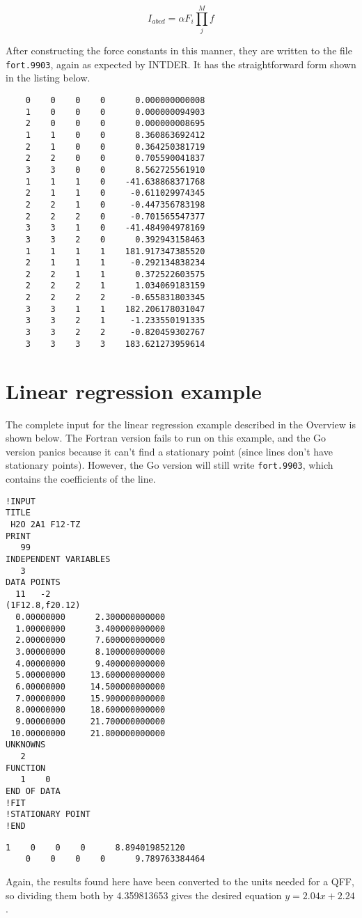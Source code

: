 \documentclass{article}
\begin{document}
\begin{equation}
  \label{eq:force}
  I_{abcd} = \alpha F_i \prod_j^M f
\end{equation}

After constructing the force constants in this manner, they are written to the
file \verb|fort.9903|, again as expected by INTDER. It has the straightforward
form shown in the listing below.

\begin{lstlisting}
    0    0    0    0      0.000000000008
    1    0    0    0      0.000000094903
    2    0    0    0      0.000000008695
    1    1    0    0      8.360863692412
    2    1    0    0      0.364250381719
    2    2    0    0      0.705590041837
    3    3    0    0      8.562725561910
    1    1    1    0    -41.638868371768
    2    1    1    0     -0.611029974345
    2    2    1    0     -0.447356783198
    2    2    2    0     -0.701565547377
    3    3    1    0    -41.484904978169
    3    3    2    0      0.392943158463
    1    1    1    1    181.917347385520
    2    1    1    1     -0.292134838234
    2    2    1    1      0.372522603575
    2    2    2    1      1.034069183159
    2    2    2    2     -0.655831803345
    3    3    1    1    182.206178031047
    3    3    2    1     -1.233550191335
    3    3    2    2     -0.820459302767
    3    3    3    3    183.621273959614
\end{lstlisting}

\appendix

\section{Linear regression example}

The complete input for the linear regression example described in the Overview
is shown below. The Fortran version fails to run on this example, and the Go
version panics because it can't find a stationary point (since lines don't have
stationary points). However, the Go version will still write \verb|fort.9903|,
which contains the coefficients of the line.

\begin{lstlisting}[caption={anpass.in}]
!INPUT
TITLE
 H2O 2A1 F12-TZ
PRINT
   99
INDEPENDENT VARIABLES
   3
DATA POINTS
  11   -2
(1F12.8,f20.12)
  0.00000000      2.300000000000
  1.00000000      3.400000000000
  2.00000000      7.600000000000
  3.00000000      8.100000000000
  4.00000000      9.400000000000
  5.00000000     13.600000000000
  6.00000000     14.500000000000
  7.00000000     15.900000000000
  8.00000000     18.600000000000
  9.00000000     21.700000000000
 10.00000000     21.800000000000
UNKNOWNS
   2
FUNCTION
   1    0
END OF DATA
!FIT
!STATIONARY POINT
!END
\end{lstlisting}

\begin{lstlisting}[caption={fort.9903}]
    1    0    0    0      8.894019852120
    0    0    0    0      9.789763384464
\end{lstlisting}

\noindent
Again, the results found here have been converted to the units needed for a QFF,
so dividing them both by 4.359813653 gives the desired equation
$y = 2.04x + 2.24$.
\end{document}
